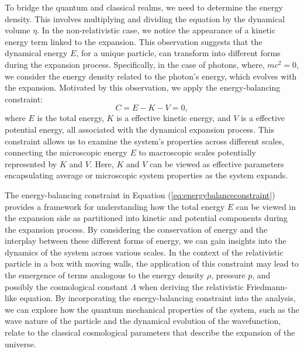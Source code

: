 \documentclass[sn-mathphys-num]{sn-jnl}%
\begin{document}
To bridge the quantum and classical realms, we need to determine the energy density. This involves multiplying and dividing the equation by the dynamical volume $\eta$. In the non-relativistic case, we notice the appearance of a kinetic energy term linked to the expansion. This observation suggests that the dynamical energy $E$, for a unique particle, can transform into different forms during the expansion process. Specifically, in the case of photons, where, $mc^2=0$, we consider the energy density related to the photon's energy, which evolves with the expansion. Motivated by this observation, we apply the energy-balancing constraint:
\begin{equation}
\ensuremath{C=E-K-V=0},\label{eq:energybalanceconstraint}
\end{equation}
where $E$ is the total energy, $K$ is a effective kinetic energy, and $V$ is a effective potential energy, all associated with the dynamical expansion process. This constraint allows us to examine the system's properties across different scales, connecting the microscopic energy $E$ to macroscopic scales potentially represented by $K$ and $V$. Here, $K$ and $V$ can be viewed as effective parameters encapsulating average or microscopic system properties as the system expands.


The energy-balancing constraint in Equation (\ref{eq:energybalanceconstraint}) provides a framework for understanding how the total energy $E$ can be viewed in the expansion side as partitioned into kinetic and potential components during the expansion process. By considering the conservation of energy and the interplay between these different forms of energy, we can gain insights into the dynamics of the system across various scales.
In the context of the relativistic particle in a box with moving walls, the application of this constraint may lead to the emergence of terms analogous to the energy density $\rho$, pressure $p$, and possibly the cosmological constant $\Lambda$ when deriving the relativistic Friedmann-like equation. By incorporating the energy-balancing constraint into the analysis, we can explore how the quantum mechanical properties of the system, such as the wave nature of the particle and the dynamical evolution of the wavefunction, relate to the classical cosmological parameters that describe the expansion of the universe.
\end{document}
